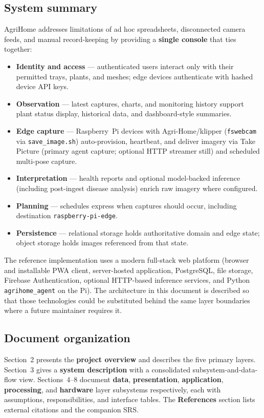 \subsection{System summary}

AgriHome addresses limitations of ad hoc spreadsheets, disconnected camera feeds, and manual record-keeping by providing a \textbf{single console} that ties together:

\begin{itemize}
  \item \textbf{Identity and access} — authenticated users interact only with their permitted trays, plants, and meshes; edge devices authenticate with hashed device API keys.
  \item \textbf{Observation} — latest captures, charts, and monitoring history support plant status display, historical data, and dashboard-style summaries.
  \item \textbf{Edge capture} — Raspberry~Pi devices with Agri-Home/klipper (\texttt{fswebcam} via \texttt{save\_image.sh}) auto-provision, heartbeat, and deliver imagery via Take Picture (primary agent capture; optional HTTP streamer still) and scheduled multi-pose capture.\cite{klipper}
  \item \textbf{Interpretation} — health reports and optional model-backed inference (including post-ingest disease analysis) enrich raw imagery where configured.
  \item \textbf{Planning} — schedules express when captures should occur, including destination \texttt{raspberry-pi-edge}.
  \item \textbf{Persistence} — relational storage holds authoritative domain and edge state; object storage holds images referenced from that state.
\end{itemize}

The reference implementation uses a modern full-stack web platform (browser and installable PWA client, server-hosted application, PostgreSQL, file storage, Firebase Authentication, optional HTTP-based inference services, and Python \texttt{agrihome\_agent} on the Pi). The architecture in this document is described so that those technologies could be substituted behind the same layer boundaries where a future maintainer requires it.

\subsection{Document organization}

Section~2 presents the \textbf{project overview} and describes the five primary layers. Section~3 gives a \textbf{system description} with a consolidated subsystem-and-data-flow view. Sections~4--8 document \textbf{data}, \textbf{presentation}, \textbf{application}, \textbf{processing}, and \textbf{hardware} layer subsystems respectively, each with assumptions, responsibilities, and interface tables. The \textbf{References} section lists external citations and the companion SRS.
